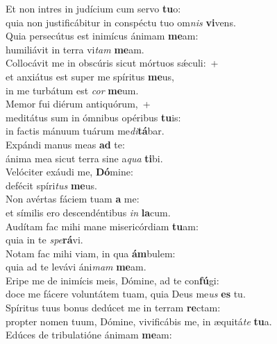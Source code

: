 \evenverse Et non intres in judícium cum servo \textbf{tu}o:~\*\\
\evenverse quia non justificábitur in conspéctu tuo om\textit{nis} \textbf{vi}vens.\\
\oddverse Quia persecútus est inimícus ánimam \textbf{me}am:~\*\\
\oddverse humiliávit in terra vi\textit{tam} \textbf{me}am.\\
\evenverse Collocávit me in obscúris sicut mórtuos sǽculi:~+\\
\evenverse  et anxiátus est super me spíritus \textbf{me}us,~\*\\
\evenverse in me turbátum est \textit{cor} \textbf{me}um.\\
\oddverse Memor fui diérum antiquórum,~+\\
\oddverse  meditátus sum in ómnibus opéribus \textbf{tu}is:~\*\\
\oddverse in factis mánuum tuárum me\textit{di}\textbf{tá}bar.\\
\evenverse Expándi manus meas \textbf{ad} te:~\*\\
\evenverse ánima mea sicut terra sine a\textit{qua} \textbf{ti}bi.\\
\oddverse Velóciter exáudi me, \textbf{Dó}mine:~\*\\
\oddverse defécit spíri\textit{tus} \textbf{me}us.\\
\evenverse Non avértas fáciem tuam \textbf{a} me:~\*\\
\evenverse et símilis ero descendéntibus \textit{in} \textbf{la}cum.\\
\oddverse Audítam fac mihi mane misericórdiam \textbf{tu}am:~\*\\
\oddverse quia in te \textit{spe}\textbf{rá}vi.\\
\evenverse Notam fac mihi viam, in qua \textbf{ám}bulem:~\*\\
\evenverse quia ad te levávi áni\textit{mam} \textbf{me}am.\\
\oddverse Eripe me de inimícis meis, Dómine, ad te con\textbf{fú}gi:~\*\\
\oddverse doce me fácere voluntátem tuam, quia Deus me\textit{us} \textbf{es} tu.\\
\evenverse Spíritus tuus bonus dedúcet me in terram \textbf{re}ctam:~\*\\
\evenverse propter nomen tuum, Dómine, vivificábis me, in æquitá\textit{te} \textbf{tu}a.\\
\oddverse Edúces de tribulatióne ánimam \textbf{me}am:~\*\\
